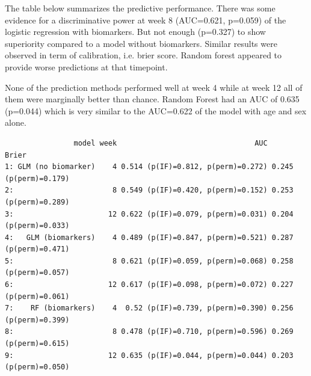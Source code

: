 \documentclass[12pt]{article}
\begin{document}
The table below summarizes the predictive performance. There was some
evidence for a discriminative power at week 8 (AUC=0.621, p=0.059) of
the logistic regression with biomarkers. But not enough (p=0.327) to
show superiority compared to a model without biomarkers. Similar
results were observed in term of calibration, i.e. brier score. Random
forest appeared to provide worse predictions at that timepoint.

\bigskip

None of the prediction methods performed well at week 4 while at week
12 all of them were marginally better than chance. Random Forest had
an AUC of 0.635 (p=0.044) which is very similar to the AUC=0.622 of
the model with age and sex alone.

\label{}
\begin{verbatim}
                model week                                AUC                 Brier
1: GLM (no biomarker)    4 0.514 (p(IF)=0.812, p(perm)=0.272) 0.245 (p(perm)=0.179)
2:                       8 0.549 (p(IF)=0.420, p(perm)=0.152) 0.253 (p(perm)=0.289)
3:                      12 0.622 (p(IF)=0.079, p(perm)=0.031) 0.204 (p(perm)=0.033)
4:   GLM (biomarkers)    4 0.489 (p(IF)=0.847, p(perm)=0.521) 0.287 (p(perm)=0.471)
5:                       8 0.621 (p(IF)=0.059, p(perm)=0.068) 0.258 (p(perm)=0.057)
6:                      12 0.617 (p(IF)=0.098, p(perm)=0.072) 0.227 (p(perm)=0.061)
7:    RF (biomarkers)    4  0.52 (p(IF)=0.739, p(perm)=0.390) 0.256 (p(perm)=0.399)
8:                       8 0.478 (p(IF)=0.710, p(perm)=0.596) 0.269 (p(perm)=0.615)
9:                      12 0.635 (p(IF)=0.044, p(perm)=0.044) 0.203 (p(perm)=0.050)
\end{verbatim}

\clearpage

\bigskip
\end{document}

